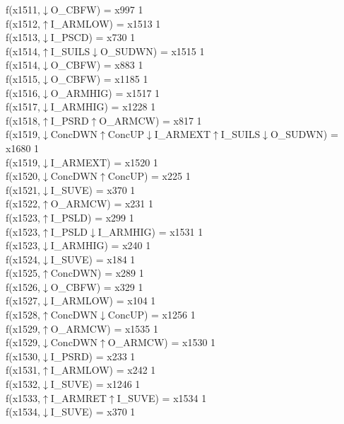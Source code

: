 f(x1511,$\downarrow$O\_CBFW) = x997 {1} \\
f(x1512,$\uparrow$I\_ARMLOW) = x1513 {1} \\
f(x1513,$\downarrow$I\_PSCD) = x730 {1} \\
f(x1514,$\uparrow$I\_SUILS$\downarrow$O\_SUDWN) = x1515 {1} \\
f(x1514,$\downarrow$O\_CBFW) = x883 {1} \\
f(x1515,$\downarrow$O\_CBFW) = x1185 {1} \\
f(x1516,$\downarrow$O\_ARMHIG) = x1517 {1} \\
f(x1517,$\downarrow$I\_ARMHIG) = x1228 {1} \\
f(x1518,$\uparrow$I\_PSRD$\uparrow$O\_ARMCW) = x817 {1} \\
f(x1519,$\downarrow$ConcDWN$\uparrow$ConcUP$\downarrow$I\_ARMEXT$\uparrow$I\_SUILS$\downarrow$O\_SUDWN) = x1680 {1} \\
f(x1519,$\downarrow$I\_ARMEXT) = x1520 {1} \\
f(x1520,$\downarrow$ConcDWN$\uparrow$ConcUP) = x225 {1} \\
f(x1521,$\downarrow$I\_SUVE) = x370 {1} \\
f(x1522,$\uparrow$O\_ARMCW) = x231 {1} \\
f(x1523,$\uparrow$I\_PSLD) = x299 {1} \\
f(x1523,$\uparrow$I\_PSLD$\downarrow$I\_ARMHIG) = x1531 {1} \\
f(x1523,$\downarrow$I\_ARMHIG) = x240 {1} \\
f(x1524,$\downarrow$I\_SUVE) = x184 {1} \\
f(x1525,$\uparrow$ConcDWN) = x289 {1} \\
f(x1526,$\downarrow$O\_CBFW) = x329 {1} \\
f(x1527,$\downarrow$I\_ARMLOW) = x104 {1} \\
f(x1528,$\uparrow$ConcDWN$\downarrow$ConcUP) = x1256 {1} \\
f(x1529,$\uparrow$O\_ARMCW) = x1535 {1} \\
f(x1529,$\downarrow$ConcDWN$\uparrow$O\_ARMCW) = x1530 {1} \\
f(x1530,$\downarrow$I\_PSRD) = x233 {1} \\
f(x1531,$\uparrow$I\_ARMLOW) = x242 {1} \\
f(x1532,$\downarrow$I\_SUVE) = x1246 {1} \\
f(x1533,$\uparrow$I\_ARMRET$\uparrow$I\_SUVE) = x1534 {1} \\
f(x1534,$\downarrow$I\_SUVE) = x370 {1} \\
